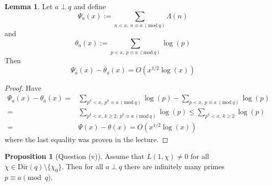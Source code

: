 \documentclass{scrartcl}
\theoremstyle{definition}
\newtheorem{lemma}[definition]{Lemma}
\newtheorem{proposition}[definition]{Proposition}
\begin{document}
\begin{lemma}
    \label{prop:correlation_theta_Psi}
    Let $a \perp q$ and define
    \begin{equation*}
        \Psi_a(x) := \sum_{n < x, \ n \equiv a \ (\text{mod} \ q)} \Lambda(n)
    \end{equation*}
    and
    \begin{equation*}
        \theta_a(x) := \sum_{p < x, \ p \equiv a \ (\text{mod} \ q)} \log(p)
    \end{equation*}
    Then
    \begin{equation*}
        \Psi_a(x) - \theta_a(x) = O(x^{1/2}\log(x))
    \end{equation*}
\end{lemma}
\begin{proof}
    Have
    \begin{align*}
        \Psi_a(x) - \theta_a(x) =& \sum_{p^k < x, \ p^k \equiv a \ (\text{mod} \ q)} \log(p) - \sum_{p < x, \ p \equiv a \ (\text{mod} \ q)} \log(p) \\
        =& \sum_{p^k < x, \ k \geq 2, \ p^k \equiv a \ (\text{mod} \ q)} \log(p) \leq \sum_{p^k < x, \ k \geq 2} \log(p) \\
        =& \Psi(x) - \theta(x) = O(x^{1/2}\log(x))
    \end{align*}
    where the last equality was proven in the lecture.
\end{proof}
\begin{proposition}[Question (v)]
    \label{prop:infinite_primes_congruent}
    Assume that $L(1, \chi) \neq 0$ for all $\chi \in \mathrm{Dir}(q) \setminus \{ \chi_0 \}$.
    Then for all $a \perp q$ there are infinitely many primes $p \equiv a \pmod q$.
\end{proposition}
\end{document}

